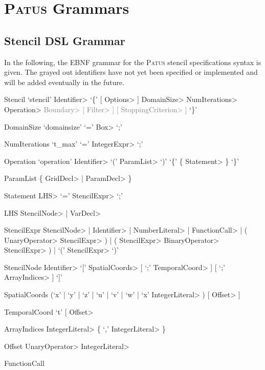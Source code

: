\chapter{\textsc{Patus} Grammars}
\label{sec:appendix_grammars}

\section{Stencil DSL Grammar}

In the following, the EBNF grammar for the \textsc{Patus} stencil specifications syntax is given.
The grayed out identifiers have not yet been specified or implemented and will be added eventually
in the future.

\begin{EBNF}
	\item[Stencil]
		`stencil' \<Identifier> `\{' [ \<Options> ] \<DomainSize> \<NumIterations> \<Operation>
			\textcolor{gray}{\<Boundary> [ \<Filter> ] [ \<StoppingCriterion> ]} `\}'
	\item[DomainSize]
		`domainsize' `=' \<Box> `;'
	\item[NumIterations]
		`t\_max' `=' \<IntegerExpr> `;'
	\item[Operation]
    	`operation' \<Identifier> `(' \<ParamList> `)' `\{' \{ \<Statement> \} `\}'
	\item[ParamList]
		\{ \<GridDecl> | \<ParamDecl> \}
	\item[Statement]
		\<LHS> `=' \<StencilExpr> `;'
	\item[LHS]
		\<StencilNode> | \<VarDecl>
	\item[StencilExpr]
		\<StencilNode> | \<Identifier> | \<NumberLiteral> | \<FunctionCall> | ( \<UnaryOperator> \<StencilExpr> ) | ( \<StencilExpr> \<BinaryOperator> \<StencilExpr> ) | `(' \<StencilExpr> `)'
	\item[StencilNode]
		\<Identifier> `[' \<SpatialCoords> [ `;' \<TemporalCoord> ] [ `;' \<ArrayIndices> ] `]'
	\item[SpatialCoords]
		(`x' | `y' | `z' | `u' | `v' | `w' | `x' \<IntegerLiteral> ) [ \<Offset> ]
	\item[TemporalCoord]
		`t' [ \<Offset>
	\item[ArrayIndices]
		\<IntegerLiteral> \{ `,' \<IntegerLiteral> \}
	\item[Offset]
		\<UnaryOperator> \<IntegerLiteral>
	\item[FunctionCall]

\end{EBNF}
